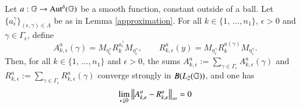 \documentclass[leqno]{amsart}
\begin{document}
	
	\begin{proposition}\label{limitzero}
		Let $a: \mathbb{G}\rightarrow{\rm Aut^{\delta}}(\mathbb{G})$ be a smooth function, constant outside of a ball. Let $\{a^\gamma_\epsilon\}_{(\epsilon,\gamma)\in\Lambda}$ be as in Lemma \ref{approximation}. For all $k\in \{1,\,\dotsc, n_1\}$, $\epsilon>0$ and $\gamma\in\Gamma_\epsilon$, define
		$$A^a_{k,\epsilon}(\gamma)=M_{\eta^\gamma_\epsilon} R^{a^\gamma_\epsilon}_kM_{\eta^\gamma_\epsilon},\qquad R^a_{k,\epsilon}(y)=M_{\eta^\gamma_\epsilon} R^{a(\gamma)}_kM_{\eta^\gamma_\epsilon}.$$
		Then, for all $k\in \{1,\,\dotsc, n_1\}$ and $\epsilon>0$, the sums $A^a_{k,\epsilon}:=\sum_{\gamma\in\Gamma_\epsilon} A^a_{k,\epsilon}(\gamma)$ and $R^a_{k,\epsilon}:=\sum_{\gamma\in\Gamma_\epsilon} R^a_{k,\epsilon}(\gamma)$ converge strongly in $B(L_2(\mathbb{G}))$, and one has
		$$\lim_{\epsilon\downarrow 0} \left\lVert A^a_{k,\epsilon}-R^a_{k,\epsilon}\right\rVert_\infty=0$$
	\end{proposition}
\end{document}
